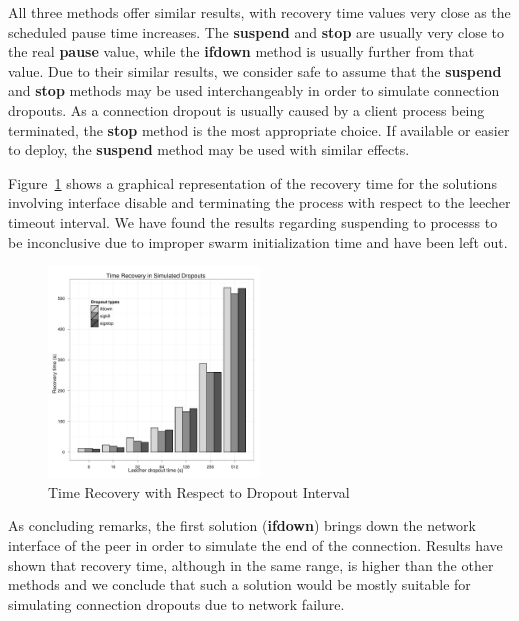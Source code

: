 All three methods offer similar results, with recovery time values very close
as the scheduled pause time increases. The \textbf{suspend} and \textbf{stop}
are usually very close to the real \textbf{pause} value, while the
\textbf{ifdown} method is usually further from that value. Due to their
similar results, we consider safe to assume that the \textbf{suspend} and
\textbf{stop} methods may be used interchangeably in order to simulate
connection dropouts. As a connection dropout is usually caused by a client
process being terminated, the \textbf{stop} method is the most appropriate
choice. If available or easier to deploy, the \textbf{suspend} method may be
used with similar effects.

Figure~\ref{fig:virt-infra:time-recovery} shows a graphical representation of
the recovery time for the solutions involving interface disable and
terminating the process with respect to the leecher timeout interval. We have
found the results regarding suspending to processs to be inconclusive due to
improper swarm initialization time and have been left out.

\begin{figure}[h]
  \begin{center}
    \includegraphics[width=0.5\textwidth]{src/img/virt-infra/recovery-in-simulated-dropouts.pdf}
  \end{center}
  \caption{Time Recovery with Respect to Dropout Interval}
  \label{fig:virt-infra:time-recovery}
\end{figure}

As concluding remarks, the first solution (\textbf{ifdown}) brings down the
network interface of the peer in order to simulate the end of the connection.
Results have shown that recovery time, although in the same range, is higher
than the other methods and we conclude that such a solution would be mostly
suitable for simulating connection dropouts due to network failure.

